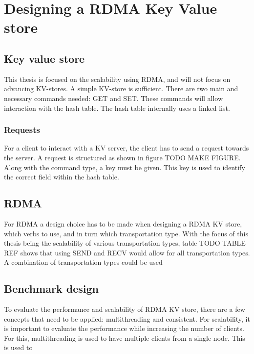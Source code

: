 
\chapter{Designing a RDMA Key Value store}\label{ch:design} %



\ifpdf
    \graphicspath{{7/figures/PNG/}{7/figures/PDF/}{7/figures/}}
\else
    \graphicspath{{7/figures/EPS/}{7/figures/}}
\fi


% 

\section{Key value store}
This thesis is focused on the scalability using RDMA, and will not focus on advancing KV-stores.
A simple KV-store is sufficient.
There are two main and necessary commands needed: GET and SET.
These commands will allow interaction with the hash table.
The hash table internally uses a linked list.

\subsection{Requests}
For a client to interact with a KV server, the client has to send a request towards the server.
A request is structured as shown in figure TODO MAKE FIGURE.
Along with the command type, a key must be given.
This key is used to identify the correct field within the hash table.


\section{RDMA}
For RDMA a design choice has to be made when designing a RDMA KV store, which verbs to use, and in turn which transportation type.
With the focus of this thesis being the scalability of various transportation types,  table TODO TABLE REF shows that using SEND and RECV would allow for all transportation types.
A combination of transportation types could be used


\section{Benchmark design}
To evaluate the performance and scalability of RDMA KV store, there are a few concepts that need to be applied: multithreading and consistent.
For scalability, it is important to evaluate the performance while increasing the number of clients.
For this, multithreading is used to have multiple clients from a single node.
This is used to

